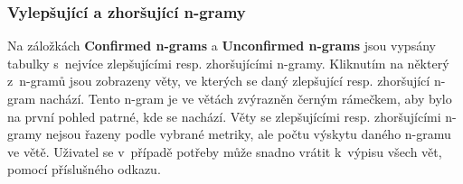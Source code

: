 \subsubsection{Vylepšující a zhoršující \mbox{n-gramy}}
Na záložkách \textbf{Confirmed \mbox{n-grams}} a \textbf{Unconfirmed \mbox{n-grams}} jsou vypsány tabulky s~nejvíce zlepšujícími resp. zhoršujícími \mbox{n-gramy}.
Kliknutím na některý z~\mbox{n-gramů} jsou zobrazeny věty,
  ve kterých se daný zlepšující resp. zhoršující \mbox{n-gram} nachází.
Tento \mbox{n-gram} je ve větách zvýrazněn černým rámečkem,
  aby bylo na první pohled patrné,
  kde se nachází.
Věty se zlepšujícími resp. zhoršujícími \mbox{n-gramy} nejsou řazeny podle vybrané metriky,
  ale počtu výskytu daného \mbox{n-gramu} ve větě.
Uživatel se v~případě potřeby může snadno vrátit k~výpisu všech vět, pomocí příslušného odkazu.



